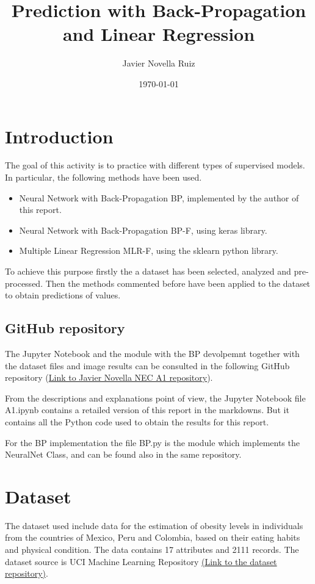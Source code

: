 \documentclass[11pt, a4paper]{article}
\title{Prediction with Back-Propagation and Linear Regression }
\author{Javier Novella Ruiz}
\date{\today}
\begin{document}


\tableofcontents

\newpage

\section{Introduction}

The goal of this activity is to practice with different types of supervised models. In particular, the following methods have been used. 
\begin{itemize}
    \item Neural Network with Back-Propagation BP, implemented by the author of this report.
    \item Neural Network with Back-Propagation BP-F, using keras library.
    \item Multiple Linear Regression MLR-F, using the sklearn python library.
\end{itemize}

To achieve this purpose firstly the a dataset has been selected, analyzed and pre-processed. Then the methods commented before have been
applied to the dataset to obtain predictions of values.

\subsection{GitHub repository}

The Jupyter Notebook and the module with the BP devolpemnt together with the dataset files and image results can be consulted in
the following GitHub repository (\href{https://github.com/novella93/NEC_A1}{Link to Javier Novella NEC A1 repository}).

\vspace{1em} From the descriptions and explanations point of view, the Jupyter Notebook file A1.ipynb contains a retailed version of this 
report in the markdowns. But it contains all the Python code used to obtain the results for this report.

\vspace{1em} For the BP implementation the file BP.py is the module which implements the NeuralNet Class, and can be found also in the same
repository.

\section{Dataset}

The dataset used include data for the estimation of obesity levels in individuals from the countries of Mexico, Peru and Colombia, based 
on their eating habits and physical condition. The data contains 17 attributes and 2111 records. The dataset source is UCI Machine Learning 
Repository \href{https://archive.ics.uci.edu/dataset/544/estimation+of+obesity+levels+based+on+eating+habits+and+physical+condition}{(Link to the dataset repository)}.
\end{document}
